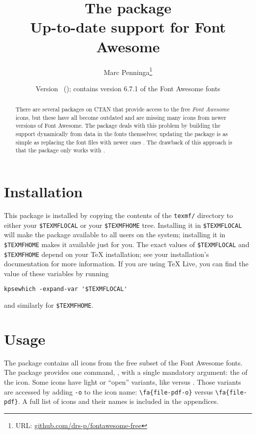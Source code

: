 \documentclass[10pt, a4paper]{ltxdoc}
\begin{document}
\title{The \textsf{\jobname} package\\Up-to-date  support for Font Awesome }
\author{Marc Penninga\thanks{URL: \href{https://github.com/drs-p/fontawesome-free}{ github.com/drs-p/fontawesome-free}}}
\makeatletter
\date{Version \fontawesome@free@version\ (\fontawesome@free@date); contains version 6.7.1 of the Font Awesome fonts}
\makeatother
\maketitle

\begin{abstract}
    There are several packages on CTAN that provide access to the free \emph{Font Awesome} icons, but these have all become outdated and are missing many icons from newer versions of Font Awesome.
    The \textsf{\jobname} package deals with this problem by building the  support dynamically from data in the fonts themselves; updating the package is as simple as replacing the font files with newer ones . The drawback of this approach is that the package only works with  .
\end{abstract}


\tableofcontents


\section{Installation}
This package is installed by copying the contents of the \texttt{texmf/} directory to either your \texttt{\$TEXMFLOCAL} or your \texttt{\$TEXMFHOME} tree.
Installing it in \texttt{\$TEXMFLOCAL} will make the package available to all users on the system; installing it in \texttt{\$TEXMFHOME} makes it available just for you.
The exact values of \texttt{\$TEXMFLOCAL} and \texttt{\$TEXMFHOME} depend on your TeX installation; see your installation's documentation for more information.
If you are using TeX Live, you can find the value of these variables by running
\begin{center}
    \verb|kpsewhich -expand-var '$TEXMFLOCAL'|
\end{center}
and similarly for \texttt{\$TEXMFHOME}.


\section{Usage}
The \textsf{\jobname} package contains all icons from the free subset of the Font Awesome fonts. \DescribeMacro{\fa}The package provides one command, , with a single mandatory argument: the  of the icon. Some icons have light or ``open'' variants, like  versus . Those variants are accessed by adding \texttt{-o} to the icon name: \verb|\fa{file-pdf-o}| versus \verb|\fa{file-pdf}|. A full list of icons and their names is included in the appendices.
\end{document}
